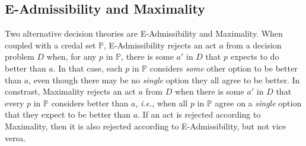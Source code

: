 \documentclass[a4paper]{article}
\newtheorem{definition}{Definition}
\renewcommand\P{\mathbb{P}} %
\newcommand\Exp{\mathsf{Exp}}
\newcommand\U{\mathfrak{U}} %
\newcommand\Maximin{\Gamma}
\renewcommand\S{\mathcal{S}}
\newcommand\s{\mathsf{s}}
\newcommand{\IB}{\mathbb{B}}
\newcommand{\IP}{\P}
\newcommand{\todoold}[2][]{\todo[backgroundcolor=white,bordercolor=orange!10,linecolor=gray!10, #1,caption={},textcolor=gray]{Pre-rev: #2}}
\newcommand{\todooldinfo}[2][]{\todoold[#1]{#2}}
\renewcommand{\leq}{\leqslant}
\newenvironment{CCM rewritten}
{\begingroup\color{blue}} %
{\endgroup}              %
\begin{document}


\subsection{E-Admissibility and Maximality}\label{sect:e-admiss}\label{sect:Max}


{ Two alternative decision theories are E-Admissibility and Maximality. When coupled with a credal set $\IP$, E-Admissibility rejects an act $a$ from a decision problem $D$ when, for any $p$ in $\IP$, there is some $a'$ in $D$ that $p$ expects to do better than $a$. In that case, each $p$ in $\IP$ considers \emph{some} other option to be better than $a$, even though there may be no \emph{single} option they all agree to be better. In constrast, Maximality rejects an act $a$ from $D$ when there is some $a'$ in $D$ that every $p$ in $\IP$ considers better than $a$, \emph{i.e.}, when all $p$ in $\IP$ agree on a \emph{single} option that they expect to be better than $a$. If an act is rejected according to Maximality, then it is also rejected according to E-Admissibility, but not vice versa.}
\end{document}
